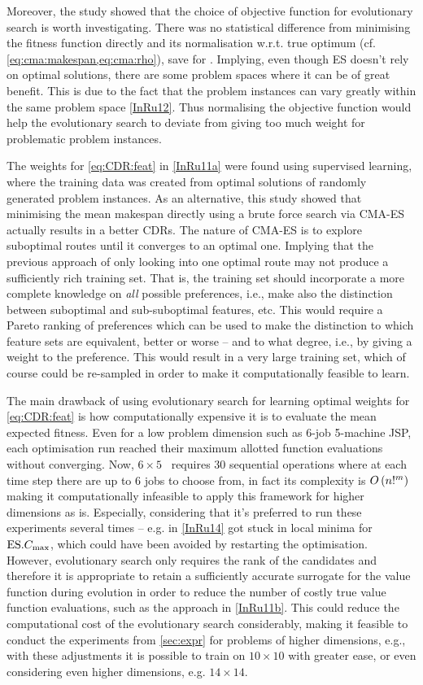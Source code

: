 Moreover, the study showed that the choice of objective function  for 
evolutionary search is worth investigating. There was no statistical difference 
from minimising the fitness function directly and its normalisation w.r.t. true 
optimum (cf. \cref{eq:cma:makespan,eq:cma:rho}), save for . 
Implying, even though ES doesn't rely on optimal solutions, there are some 
problem spaces where it can be of great benefit. This is due to the fact that 
the problem instances can vary greatly within the same problem space 
\cref{InRu12}. Thus normalising the objective function would help the 
evolutionary search to deviate from giving too much weight for problematic 
problem instances.

The weights for \cref{eq:CDR:feat} in \cref{InRu11a} were found using 
supervised learning, where the training data was created from optimal solutions 
of randomly generated problem instances. As an alternative, this study showed  
that minimising the mean makespan directly using a brute force search via 
CMA-ES actually results in a better CDRs. The nature of CMA-ES is to explore 
suboptimal routes until it converges to an optimal one. Implying that the 
previous approach of only looking into one optimal route may not produce a 
sufficiently rich training set. That is, the training set should incorporate a 
more complete knowledge on \emph{all} possible preferences, i.e., make also the 
distinction between suboptimal and sub-suboptimal features, etc.  This would 
require a Pareto ranking of preferences which can be used to make the 
distinction to which feature sets are equivalent, better or worse -- and to 
what degree, i.e., by giving a weight to the preference. This would result in a 
very large training set, which of course could be re-sampled in order to make 
it computationally feasible to learn.

The main drawback of using evolutionary search for learning optimal weights for 
\cref{eq:CDR:feat} is how computationally expensive it is to evaluate the mean 
expected fitness. Even for a low problem dimension such  as 6-job 5-machine 
JSP, each optimisation run reached their maximum allotted function evaluations 
without converging. 
Now, $6\times5$ \JSP\ requires 30 sequential operations where at each time step 
there are up to $6$ jobs to choose from, in fact its complexity is  
${O}\left(n!^m\right)$ \citep{Giffler60} making it computationally infeasible to apply 
this framework for higher dimensions as is. Especially, considering that it's 
preferred to run these experiments several times -- e.g. in \cref{InRu14} 
 got stuck in local minima for $\text{ES}.{C_{\max}}$, which could have been 
avoided by restarting the optimisation.
However, evolutionary search only requires the rank of the candidates and 
therefore it is appropriate to retain a sufficiently accurate surrogate for the 
value function during evolution in order to reduce the number of costly true 
value function evaluations, such as the approach in \cref{InRu11b}. This could 
reduce the computational cost of the evolutionary search considerably, making 
it feasible to conduct the experiments from \cref{sec:expr} for problems of 
higher dimensions, e.g., with these adjustments it is possible to train on 
$10\times10$ with greater ease, or even considering even  higher dimensions, 
e.g. $14\times14$.
